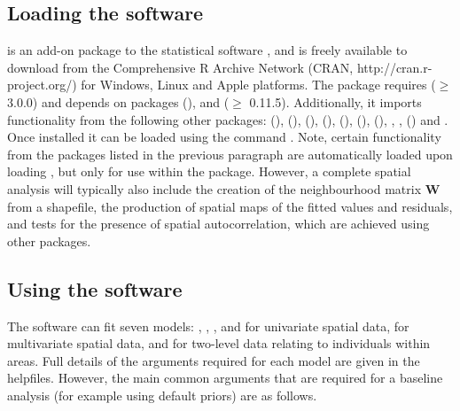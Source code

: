 \documentclass[article,shortnames,nojss]{jss}
\begin{document}
\subsection{Loading the software}
 is an add-on package to the statistical software , and is freely available to download from the Comprehensive R Archive Network (CRAN, http://cran.r-project.org/) for Windows, Linux and Apple platforms. The package requires  ($\geq$ 3.0.0) and depends on packages  (\citealp{mass2002}), and  ($\geq$ 0.11.5). Additionally, it imports functionality from the following other packages:  (\citealp{carbayesdata}),  (\citealp{coda2006}),  (\citealp{leaflet}),  (\citealp{matrixcalc}),  (\citealp{mcmcpack}),  (\citealp{spam2010}),  (\citealp{bivand2013b}), , ,  (\citealp{truncnorm2014}) and . Once installed it can be loaded using the command . Note, certain functionality from the packages listed in the previous paragraph are automatically loaded upon loading , but only for use within the package. However, a complete spatial analysis will typically also include the creation of the neighbourhood matrix $\mathbf{W}$ from a shapefile, the production of spatial maps of the fitted values and residuals, and tests for the presence of spatial autocorrelation, which are achieved using other packages.



\subsection{Using the software}
The software can fit  seven models: ,  , ,  and  for univariate spatial data,   for multivariate spatial data, and  for two-level data relating to individuals within areas. Full details of the arguments required for each model are given in the helpfiles. However, the main common arguments that are required for a baseline analysis (for example using default priors) are as follows.
\end{document}
